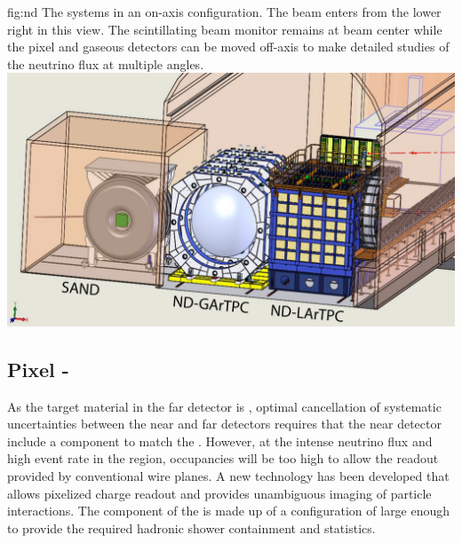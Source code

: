 \documentclass[../main-v1.tex]{subfiles}
\begin{document}
 
 \begin{dunefigure}
{fig:nd}
{The  systems in an on-axis configuration.  The beam enters from the lower right in this view. The  scintillating beam monitor remains at beam center while the pixel %
 and gaseous   detectors can be moved off-axis to make detailed studies of the neutrino flux at multiple angles.}
\includegraphics[height=0.5\textwidth]{graphics/IntroFigures/All3Detectors.pdf}
\end{dunefigure}

 \subsection{Pixel  -  }
 
 As the target material in the %
 far detector is , optimal cancellation of systematic uncertainties between the near and far detectors requires that the near detector include a   component to match the .  However, at the intense neutrino flux and high event rate in the  region, occupancies will be too high to allow the \twod readout provided by conventional wire planes. A new   technology has been developed that allows pixelized charge readout  and provides unambiguous \threed imaging of  particle interactions.  The  component of the  is made up of a configuration of     large enough to provide the required hadronic shower containment and statistics.  %
 
\end{document}
